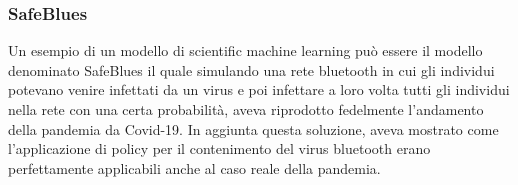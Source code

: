 \subsubsection*{SafeBlues}
Un esempio di un modello di scientific machine learning può 
essere il modello denominato SafeBlues 
\cite{10.1371/journal.pdig.0000142} il quale simulando una 
rete bluetooth in cui gli individui potevano venire infettati 
da un virus e poi infettare a loro volta tutti gli individui 
nella rete con una certa probabilità, aveva riprodotto 
fedelmente l’andamento della pandemia da Covid-19. 
In aggiunta questa soluzione, aveva mostrato come 
l’applicazione di policy per il contenimento del virus 
bluetooth erano perfettamente applicabili anche al caso 
reale della pandemia. 
